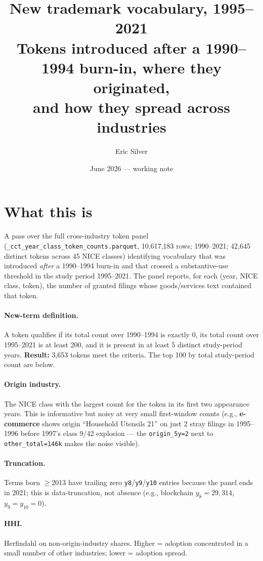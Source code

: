 \documentclass[11pt]{article}
\title{\bfseries New trademark vocabulary, 1995--2021\\
\large Tokens introduced after a 1990--1994 burn-in, where they originated,\\ and how they spread across industries}
\author{Eric Silver}
\date{June 2026 --- working note}
\begin{document}
\maketitle

\section*{What this is}
A pass over the full cross-industry token panel
(\texttt{\_cct\_year\_class\_token\_counts.parquet}, 10{,}617{,}183 rows;
1990--2021; 42{,}645 distinct tokens across 45 NICE classes) identifying
vocabulary that was introduced \emph{after} a 1990--1994 burn-in and that
crossed a substantive-use threshold in the study period 1995--2021. The
panel reports, for each (year, NICE class, token), the number of granted
filings whose goods/services text contained that token.

\paragraph{New-term definition.} A token qualifies if its total count over
1990--1994 is exactly 0, its total count over 1995--2021 is at least 200,
and it is present in at least 5 distinct study-period years.
\textbf{Result:} 3{,}653 tokens meet the criteria. The top 100 by total
study-period count are below.

\paragraph{Origin industry.} The NICE class with the largest count for the
token in its first two appearance years. This is informative but noisy at
very small first-window counts (e.g., \textbf{e-commerce} shows origin
``Household Utensils 21'' on just 2 stray filings in 1995--1996 before
1997's class 9/42 explosion --- the \texttt{origin\_5y=2} next to
\texttt{other\_total=146k} makes the noise visible).

\paragraph{Truncation.} Terms born $\geq$2013 have trailing zero
\texttt{y8}/\texttt{y9}/\texttt{y10} entries because the panel ends in 2021;
this is data-truncation, not absence (e.g., blockchain $y_8 = 29{,}314$,
$y_9 = y_{10} = 0$).

\paragraph{HHI.} Herfindahl on non-origin-industry shares. Higher = adoption
concentrated in a small number of other industries; lower = adoption spread.
\end{document}
